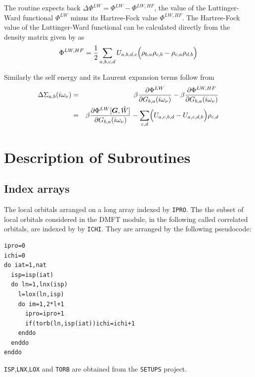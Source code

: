 \documentclass[11pt,a4paper]{report}
\begin{document}
The routine expects back $\Delta\Phi^{LW}=\Phi^{LW}-\Phi^{LW,HF}$, the
value of the Luttinger-Ward functional $\Phi^{LW}$ minus its Hartree-Fock value
$\Phi^{LW,HF}$. The Hartree-Fock value of the Luttinger-Ward
functional can be calculated directly from the density matrix given by
 as
\begin{eqnarray}
\Phi^{LW,HF}=\frac{1}{2}\sum_{a,b,c,d}U_{a,b,d,c}
\Bigl(\rho_{b,a}\rho_{c,b}-\rho_{c,a}\rho_{d,b}\Bigr)
\label{eq:philwhf}
\end{eqnarray}


Similarly the self energy and its Laurent expansion terms follow from
\begin{eqnarray}
\Delta\Sigma_{a,b}(i\omega_\nu)&=&
\beta\frac{\partial\Phi^{LW}}{\partial G_{b,a}(i\omega_\nu)}
-\beta\frac{\partial\Phi^{LW,HF}}{\partial G_{b,a}(i\omega_\nu)}
\nonumber\\
&=&\beta\frac{\partial\Phi^{LW}[\bm{G},\hat{W}]}{\partial G_{b,a}(i\omega_\nu)}
-\sum_{c,d}\Bigl(U_{a,c,b,d}-U_{a,c,d,b}\Bigr)\rho_{c,d}
\end{eqnarray}



\section{Description of Subroutines}
\subsection{Index arrays}
\label{sec:indexarrays}
The local orbitals arranged on a long array indexed by \verb|IPRO|.
The the subset of local orbitals considered in the DMFT module, in the
following called correlated orbitals, are indexed by by
\verb|ICHI|. They are arranged by the following pseudocode:
\begin{verbatim}
ipro=0
ichi=0
do iat=1,nat
  isp=isp(iat)
  do ln=1,lnx(isp)
    l=lox(ln,isp)
    do im=1,2*l+1
      ipro=ipro+1
      if(torb(ln,isp(iat))ichi=ichi+1
    enddo
  enddo
enddo
\end{verbatim}
\verb|ISP|,\verb|LNX|,\verb|LOX| and \verb|TORB| are obtained from the
\verb|SETUPS| project.


\end{document}
